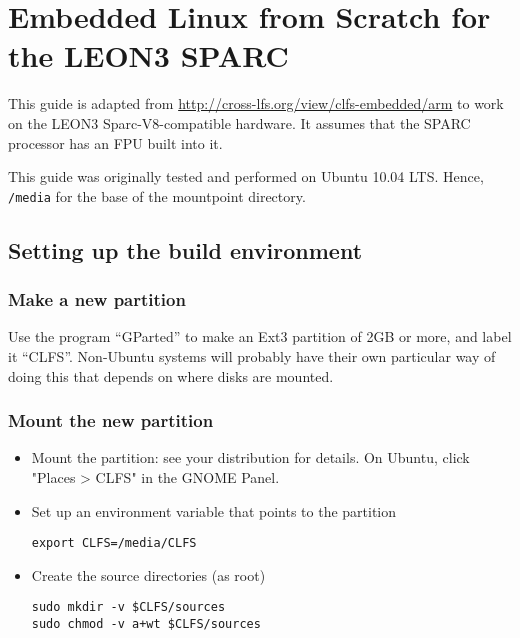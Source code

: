 \section{Embedded Linux from Scratch for the LEON3 SPARC}
\label{sec:sparc_embedded_guide}
\lstset{frame=single,language=bash,basicstyle=\small\ttfamily}
 This guide is adapted from \url{http://cross-lfs.org/view/clfs-embedded/arm} to work on the LEON3
 Sparc-V8-compatible hardware. It assumes that the SPARC processor has an \ac{FPU} built into it.


This guide was originally tested and performed on Ubuntu 10.04 LTS. Hence, \texttt{/media} for the base of the
mountpoint directory.


\subsection{Setting up the build environment}
 \subsubsection{Make a new partition}
Use the program ``GParted'' to make an Ext3 partition of 2GB or more, and label it ``CLFS''. Non-Ubuntu
systems will probably have their own particular way of doing this that depends on where disks are mounted.
 \subsubsection{Mount the new partition}
 \begin{itemize}
  \item Mount the partition: see your distribution for details. On Ubuntu, click "Places > CLFS" in the GNOME
    Panel.
  \item Set up an environment variable that points to the partition
\begin{lstlisting}
export CLFS=/media/CLFS
\end{lstlisting}
  \item Create the source directories (as root)
    \begin{lstlisting}
sudo mkdir -v $CLFS/sources
sudo chmod -v a+wt $CLFS/sources
\end{lstlisting}
 \end{itemize}

